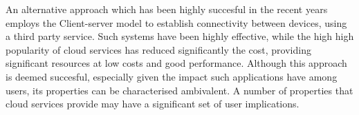 
An alternative approach which has been highly succesful in the recent years
employs the Client-server model to establish connectivity between devices, using
a third party service. Such systems have been highly effective, while the high
high popularity of cloud services has reduced significantly the cost, providing
significant resources at low costs and good performance. 
Although this approach is deemed succesful, especially given
the impact such applications have among users, its properties can be
characterised ambivalent. A number of properties that cloud services provide
may have a significant set of user implications. 

